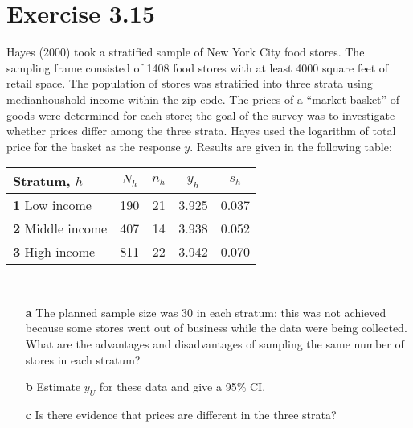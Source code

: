 \documentclass{article}\usepackage{graphicx, color}
\begin{document}
\section*{Exercise 3.15}
Hayes (2000) took a stratified sample of New York City food stores. The sampling frame consisted of 1408 food stores with at least 4000 square feet of retail space. The population of stores was stratified into three strata using medianhoushold income within the zip code. The prices of a ``market basket'' of goods were determined for each store; the goal of the survey was to investigate whether prices differ among the three strata.  Hayes used the logarithm of total price for the basket as the response $y$. Results are given in the following table:\\[10pt]
\begin{tabular}{lcccc}
Stratum, $h$ & $N_h$ & $n_h$ & $\bar{y}_h$ & $s_h$ \\
\hline
{\bf 1} Low income & 190&21&3.925&0.037\\
{\bf 2} Middle income & 407&14&3.938&0.052\\
{\bf 3} High income & 811&22&3.942&0.070\\
\end{tabular}\\[10pt]
\begin{enumerate}
  \item[{\bf a}] The planned sample size was 30 in each stratum; this was not achieved because some stores went out of business while the data were being collected. What are the advantages and disadvantages of sampling the same number of stores in  each stratum?
  \item[{\bf b}] Estimate $\bar{y}_U$ for these data and give a 95\% CI.
  \item[{\bf c}] Is there evidence that prices are different in the three strata?
\end{enumerate}
\end{document}
